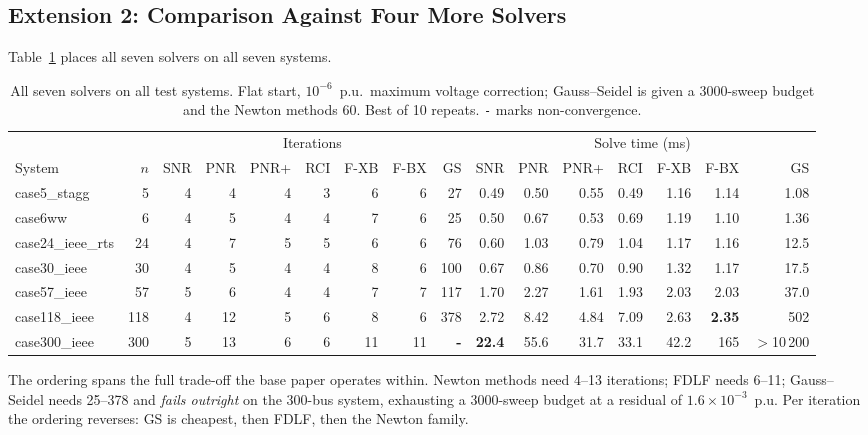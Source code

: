 \documentclass[sigconf,nonacm]{acmart}
\begin{document}
\subsection{Extension 2: Comparison Against Four More Solvers}
\label{sec:res-methods}
Table~\ref{tab:methods} places all seven solvers on all seven systems.

\begin{table}[t]
\centering
\caption{All seven solvers on all test systems. Flat start, $10^{-6}$~p.u.\
maximum voltage correction; Gauss--Seidel is given a 3000-sweep budget and the
Newton methods 60. Best of 10 repeats. \texttt{-} marks non-convergence.}
\label{tab:methods}
\small
\begin{tabular}{l r r r r r r r r r r r r r r r}
\toprule
& & \multicolumn{7}{c}{Iterations} & \multicolumn{7}{c}{Solve time (ms)} \\
\cmidrule(lr){3-9}\cmidrule(lr){10-16}
System & $n$ & SNR & PNR & PNR+ & RCI & F-XB & F-BX & GS
& SNR & PNR & PNR+ & RCI & F-XB & F-BX & GS \\
\midrule
case5\_stagg      & 5   & 4 & 4  & 4 & 3 & 6  & 6  & 27    & 0.49  & 0.50  & 0.55  & 0.49  & 1.16 & 1.14 & 1.08 \\
case6ww           & 6   & 4 & 5  & 4 & 4 & 7  & 6  & 25    & 0.50  & 0.67  & 0.53  & 0.69  & 1.19 & 1.10 & 1.36 \\
case24\_ieee\_rts & 24  & 4 & 7  & 5 & 5 & 6  & 6  & 76    & 0.60  & 1.03  & 0.79  & 1.04  & 1.17 & 1.16 & 12.5 \\
case30\_ieee      & 30  & 4 & 5  & 4 & 4 & 8  & 6  & 100   & 0.67  & 0.86  & 0.70  & 0.90  & 1.32 & 1.17 & 17.5 \\
case57\_ieee      & 57  & 5 & 6  & 4 & 4 & 7  & 7  & 117   & 1.70  & 2.27  & 1.61  & 1.93  & 2.03 & 2.03 & 37.0 \\
case118\_ieee     & 118 & 4 & 12 & 5 & 6 & 8  & 6  & 378   & 2.72  & 8.42  & 4.84  & 7.09  & 2.63 & \textbf{2.35} & 502 \\
case300\_ieee     & 300 & 5 & 13 & 6 & 6 & 11 & 11 & \textbf{-} & \textbf{22.4} & 55.6 & 31.7 & 33.1 & 42.2 & 165 & $>$10\,200 \\
\bottomrule
\end{tabular}
\end{table}

The ordering spans the full trade-off the base paper operates within. Newton
methods need 4--13 iterations; FDLF needs 6--11; Gauss--Seidel needs 25--378 and
\emph{fails outright} on the 300-bus system, exhausting a 3000-sweep budget at a
residual of $1.6\times10^{-3}$~p.u. Per iteration the ordering reverses: GS is
cheapest, then FDLF, then the Newton family.
\end{document}
